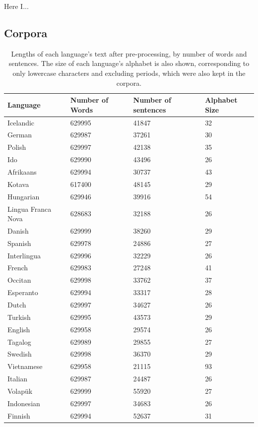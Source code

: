 \documentclass[12pt,a4paper]{article}
\numberwithin{figure}{section}
\numberwithin{table}{section}
\numberwithin{definition}{section}
\begin{document}
Here I...

\subsection{Corpora}
\label{ssec:corporaapp}


\begin{table}[!h]
  \centering
  \renewcommand{\arraystretch}{1.5}
  \begin{tabular} {|p{3cm}|p{3cm}|p{3.5cm}|p{3.0cm}|}
  \hline
  \textbf{Language} & \textbf{Number of Words} & \textbf{Number of sentences} & \textbf{Alphabet Size} \\
  \hline
  Icelandic & 629995 & 41847 & 32 \\
  German & 629987 & 37261 & 30 \\
  Polish & 629997 & 42138 & 35 \\
  Ido & 629990 & 43496 & 26 \\
  Afrikaans & 629994 & 30737 & 43 \\
  Kotava & 617400 & 48145 & 29 \\
  Hungarian & 629946 & 39916 & 54 \\
  Lingua Franca Nova & 628683 & 32188 & 26 \\
  Danish & 629999 & 38260 & 29 \\
  Spanish & 629978 & 24886 & 27 \\
  Interlingua & 629996 & 32229 & 26 \\
  French & 629983 & 27248 & 41 \\
  Occitan & 629998 & 33762 & 37 \\
  Esperanto & 629994 & 33317 & 28 \\
  Dutch & 629997 & 34627 & 26 \\
  Turkish & 629995 & 43573 & 29 \\
  English & 629958 & 29574 & 26 \\
  Tagalog & 629989 & 29855 & 27 \\
  Swedish & 629998 & 36370 & 29 \\
  Vietnamese & 629958 & 21115 & 93 \\
  Italian & 629987 & 24487 & 26 \\
  Volapük & 629999 & 55920 & 27 \\
  Indonesian & 629997 & 34683 & 26 \\
  Finnish & 629994 & 52637 & 31 \\
  \hline
  \end{tabular}
\caption{Lengths of each language's text after pre-processing, by number of words and sentences. The size of each language's alphabet is also shown, corresponding to only lowercase characters and excluding periods, which were also kept in the corpora.}
\label{tbl:preprocessedtexts}
\end{table}
\end{document}
